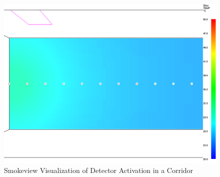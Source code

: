 \begin{figure}[h!]
\begin{center}
\includegraphics[width=6.5in]{FIGURES/Input_File/SMV_Detectors}
Smokeview Visualization of Detector Activation in a Corridor
\end{center}
\end{figure}
